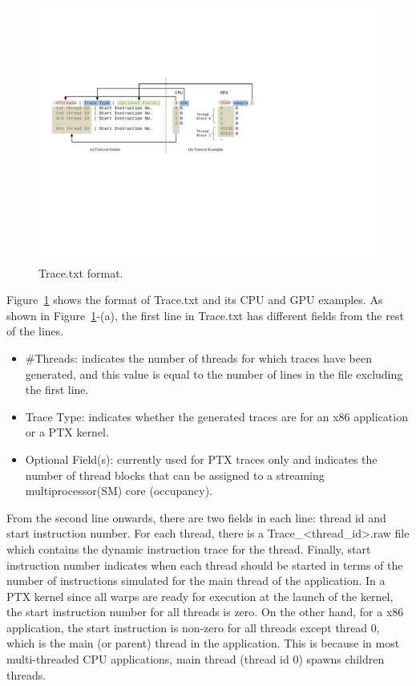 \begin{figure}[htb]
\centering
\includegraphics{figs/trace_format}
\caption{Trace.txt format.}
\label{fig:trace_format}
\end{figure}


Figure~\ref{fig:trace_format} shows the format of Trace.txt and its CPU and GPU
examples.  As shown in Figure~\ref{fig:trace_format}-(a), the first line in
Trace.txt has different fields from the rest of the lines.

\begin{itemize}\itemsep2pt
\item \#Threads: indicates the number of threads for which traces have
  been generated, and this value is equal to the number of lines in
  the file excluding the first line.
\item Trace Type: indicates whether the generated traces are for an
  x86 application or a PTX kernel.
\item Optional Field(s): currently used for PTX traces only and
  indicates the number of thread blocks that can be assigned to a
  streaming multiprocessor(SM) core (occupancy).
\end{itemize}

From the second line onwards, there are two fields in each line:
thread id and start instruction number. For each thread, there is a
Trace\_<thread\_id>.raw file which contains the dynamic instruction
trace for the thread. Finally, start instruction number indicates when
each thread should be started in terms of the number of instructions
simulated for the main thread of the application. In a PTX kernel
since all warps are ready for execution at the launch of the kernel,
the start instruction number for all threads is zero. On the other
hand, for a x86 application, the start instruction is non-zero for all
threads except thread 0, which is the main (or parent) thread in the
application. This is because in most multi-threaded CPU applications,
main thread (thread id 0) spawns children threads.


